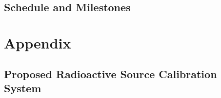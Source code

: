 \subsection{Schedule and Milestones}
\label{sec:dp-calib-sched}

\newpage

\section{Appendix}
%

%

\subsection{Proposed Radioactive Source Calibration System}
\label{sec:dp-calib-sys-rsds}


